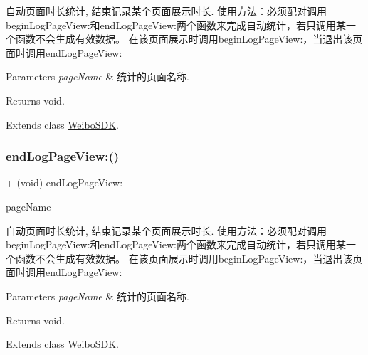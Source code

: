 自动页面时长统计, 结束记录某个页面展示时长. 使用方法：必须配对调用begin\+Log\+Page\+View\+:和end\+Log\+Page\+View\+:两个函数来完成自动统计，若只调用某一个函数不会生成有效数据。 在该页面展示时调用begin\+Log\+Page\+View\+:，当退出该页面时调用end\+Log\+Page\+View\+: 
\begin{DoxyParams}{Parameters}
{\em page\+Name} & 统计的页面名称. \\
\hline
\end{DoxyParams}
\begin{DoxyReturn}{Returns}
void. 
\end{DoxyReturn}


Extends class \mbox{\hyperlink{interface_weibo_s_d_k_aa9460b8e4fd90f3b437207c55ef2c40e}{Weibo\+S\+DK}}.

\mbox{\label{category_weibo_s_d_k_07_statistics_08_aa9460b8e4fd90f3b437207c55ef2c40e}} 
\subsubsection{\texorpdfstring{end\+Log\+Page\+View\+:()}{endLogPageView:()}\hspace{0.1cm}{\footnotesize\ttfamily [3/3]}}
{\footnotesize\ttfamily + (void) end\+Log\+Page\+View\+: \begin{DoxyParamCaption}\item[{(N\+S\+String $\ast$)}]{page\+Name }\end{DoxyParamCaption}}

自动页面时长统计, 结束记录某个页面展示时长. 使用方法：必须配对调用begin\+Log\+Page\+View\+:和end\+Log\+Page\+View\+:两个函数来完成自动统计，若只调用某一个函数不会生成有效数据。 在该页面展示时调用begin\+Log\+Page\+View\+:，当退出该页面时调用end\+Log\+Page\+View\+: 
\begin{DoxyParams}{Parameters}
{\em page\+Name} & 统计的页面名称. \\
\hline
\end{DoxyParams}
\begin{DoxyReturn}{Returns}
void. 
\end{DoxyReturn}


Extends class \mbox{\hyperlink{interface_weibo_s_d_k_aa9460b8e4fd90f3b437207c55ef2c40e}{Weibo\+S\+DK}}.

